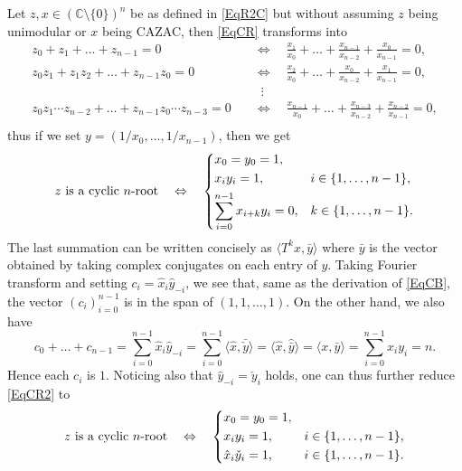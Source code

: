 \documentclass[A4,11pt]{article}
\newcommand{\bra}[1]{\langle#1\rangle}
\begin{document}
Let $z,x\in(\mathbb C\setminus\{0\})^n$ be as defined in \eqref{EqR2C} but without assuming $z$ being unimodular or $x$ being CAZAC, then \eqref{EqCR} transforms into 
\begin{align*}
z_0+z_1+\ldots+z_{n-1}=0 \quad&\Leftrightarrow\quad \frac{x_1}{x_0}+\ldots+\frac{x_{n-1}}{x_{n-2}}+\frac{x_0}{x_{n-1}}=0, \\
z_0z_1+z_1z_2+\ldots+z_{n-1}z_0=0 \quad&\Leftrightarrow\quad \frac{x_2}{x_0}+\ldots+\frac{x_0}{x_{n-2}}+\frac{x_1}{x_{n-1}}=0, \\
&\;\;\vdots \\
z_0z_1\cdots z_{n-2}+\ldots+z_{n-1}z_0\cdots z_{n-3}=0 \quad&\Leftrightarrow\quad \frac{x_{n-1}}{x_0}+\ldots+\frac{x_{n-3}}{x_{n-2}}+\frac{x_{n-2}}{x_{n-1}}=0, \\
\end{align*}
thus if we set $y=(1/x_0,\ldots,1/x_{n-1})$, then we get
\begin{equation} \label{EqCR2}
z \text{ is a cyclic $n$-root} \quad\Leftrightarrow\quad \begin{dcases}x_0=y_0=1, \\ x_iy_i=1, & i\in\{1,\ldots,n-1\}, \\ \sum_{i=0}^{n-1}x_{i+k}y_i=0, & k\in\{1,\ldots,n-1\}.\end{dcases}
\end{equation}
The last summation can be written concisely as $\bra{T^kx,\bar y}$ where $\bar y$ is the vector obtained by taking complex conjugates on each entry of $y$. Taking Fourier transform and setting $c_i=\hat x_i\hat y_{-i}$, we see that, same as the derivation of \eqref{EqCB}, the vector $(c_i)_{i=0}^{n-1}$ is in the span of $(1,1,\ldots,1)$. On the other hand, we also have
$$c_0+\ldots+c_{n-1}=\sum_{i=0}^{n-1}\hat x_i\hat y_{-i}=\sum_{i=0}^{n-1}\bra{\hat x,\bar{\check y}}=\bra{\hat x,\widehat{\bar y}}=\bra{x,\bar y}=\sum_{i=0}^{n-1}x_iy_i=n.$$
Hence each $c_i$ is $1$. Noticing also that $\hat y_{-i}=\check y_i$ holds, one can thus further reduce \eqref{EqCR2} to
\begin{equation} \label{EqCR3} 
z \text{ is a cyclic $n$-root} \quad\Leftrightarrow\quad \begin{dcases}x_0=y_0=1, \\ x_iy_i=1, & i\in\{1,\ldots,n-1\}, \\ \hat x_i\check y_{i}=1, & i\in\{1,\ldots,n-1\}.\end{dcases}
\end{equation}
\end{document}
